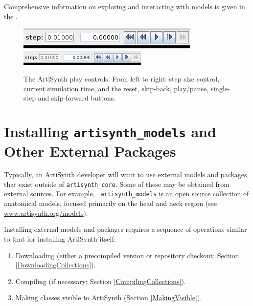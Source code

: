 Comprehensive information on exploring and interacting with models is
given in the
.

\begin{figure}[h]
\begin{center}
\iflatexml
\includegraphics[]{../uiguide/images/playControls}
\else
\includegraphics[width=2.5in]{../uiguide/images/playControls}
\fi
\end{center}
\caption{The ArtiSynth play controls. From left to right: step size
control, current simulation time, and the reset, skip-back,
play/pause, single-step and skip-forward buttons.}%
\label{PlayControlsFig}
\end{figure}

\section{Installing {\tt artisynth\_models} and Other External Packages}
\label{AdditionalModelsAndPackages}

Typically, an ArtiSynth developer will want to use external models and
packages that exist outside of {\tt artisynth\_core}.  Some of these
may be obtained from external sources.  For example, {\tt
artisynth\_models} is an open source collection of anatomical models,
focused primarily on the head and neck region
(see \href{https://www.artisynth.org/models}{www.artisynth.org/models}).

Installing external models and packages requires a sequence of
operations similar to that for installing ArtiSynth itself:

\begin{enumerate}

\item Downloading (either a precompiled version or repository checkout;
Section \ref{DownloadingCollections}).

\item Compiling (if necessary; Section \ref{CompilingCollections}).

\item Making classes visible to ArtiSynth (Section \ref{MakingVisible}).

\end{enumerate}

